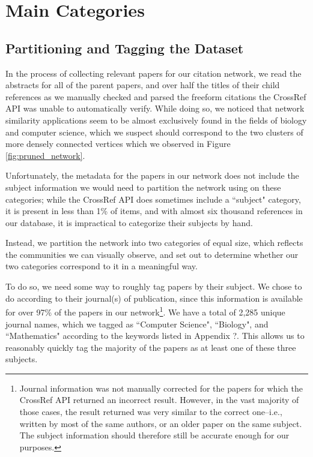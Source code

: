 \documentclass[12pt]{thesis}
\theoremstyle{plain}
\theoremstyle{definition}
\theoremstyle{remark}
\begin{document}
\chapter{Main Categories}\label{chapter:partitioning}








\section{Partitioning and Tagging the Dataset}

In the process of collecting relevant papers for our citation network, we read the abstracts for all of the parent papers, and over half the titles of their child references as we manually checked and parsed the freeform citations the CrossRef API was unable to automatically verify. While doing so, we noticed that network similarity applications seem to be almost exclusively found in the fields of biology and computer science, which we suspect should correspond to the two clusters of more densely connected vertices which we observed in Figure \ref{fig:pruned_network}.

Unfortunately, the metadata for the papers in our network does not include the subject information we would need to partition the network using on these categories; while the CrossRef API does sometimes include a ``subject" category, it is present in less than 1\% of items, and with almost six thousand references in our database, it is impractical to categorize their subjects by hand.

Instead, we partition the network into two categories of equal size, which reflects the communities we can visually observe, and set out to determine whether our two categories correspond to it in a meaningful way. 

To do so, we need some way to roughly tag papers by their subject. We chose to do according to their journal(s) of publication, since this information is available for over 97\% of the papers in our network\footnote{Journal information was not manually corrected for the papers for which the CrossRef API returned an incorrect result. However, in the vast majority of those cases, the result returned was very similar to the correct one--i.e., written by most of the same authors, or an older paper on the same subject. The subject information should therefore still be accurate enough for our purposes.}. We have a total of 2,285 unique journal names, which we tagged as ``Computer Science", ``Biology", and ``Mathematics" according to the keywords listed in Appendix ?. This allows us to reasonably quickly tag the majority of the papers as at least one of these three subjects.
\end{document}
